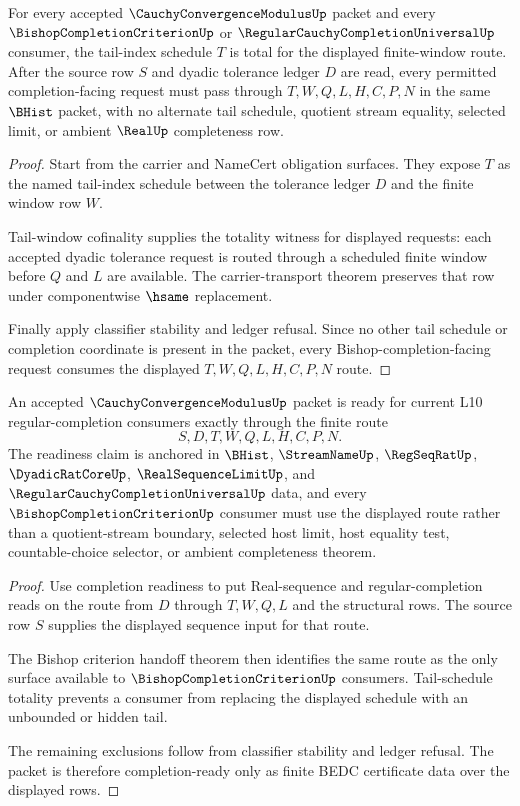\begin{theorem}
\label{thm:cauchy-convergence-modulus-tail-schedule-totality}
For every accepted $\CauchyConvergenceModulusUp$ packet and every $\BishopCompletionCriterionUp$ or $\RegularCauchyCompletionUniversalUp$ consumer, the tail-index schedule $T$ is total for the displayed finite-window route. After the source row $S$ and dyadic tolerance ledger $D$ are read, every permitted completion-facing request must pass through $T,W,Q,L,H,C,P,N$ in the same $\BHist$ packet, with no alternate tail schedule, quotient stream equality, selected limit, or ambient $\RealUp$ completeness row.
\end{theorem}
\begin{proof}
Start from the carrier and NameCert obligation surfaces. They expose $T$ as the named tail-index schedule between the tolerance ledger $D$ and the finite window row $W$.

Tail-window cofinality supplies the totality witness for displayed requests: each accepted dyadic tolerance request is routed through a scheduled finite window before $Q$ and $L$ are available. The carrier-transport theorem preserves that row under componentwise $\hsame$ replacement.

Finally apply classifier stability and ledger refusal. Since no other tail schedule or completion coordinate is present in the packet, every Bishop-completion-facing request consumes the displayed $T,W,Q,L,H,C,P,N$ route.
\end{proof}

\begin{theorem}
\label{thm:cauchy-convergence-modulus-regular-completion-readiness}
An accepted $\CauchyConvergenceModulusUp$ packet is ready for current L10 regular-completion consumers exactly through the finite route
$$
S,D,T,W,Q,L,H,C,P,N.
$$
The readiness claim is anchored in $\BHist$, $\StreamNameUp$, $\RegSeqRatUp$, $\DyadicRatCoreUp$, $\RealSequenceLimitUp$, and $\RegularCauchyCompletionUniversalUp$ data, and every $\BishopCompletionCriterionUp$ consumer must use the displayed route rather than a quotient-stream boundary, selected host limit, host equality test, countable-choice selector, or ambient completeness theorem.
\end{theorem}
\begin{proof}
Use completion readiness to put Real-sequence and regular-completion reads on the route from $D$ through $T,W,Q,L$ and the structural rows. The source row $S$ supplies the displayed sequence input for that route.

The Bishop criterion handoff theorem then identifies the same route as the only surface available to $\BishopCompletionCriterionUp$ consumers. Tail-schedule totality prevents a consumer from replacing the displayed schedule with an unbounded or hidden tail.

The remaining exclusions follow from classifier stability and ledger refusal. The packet is therefore completion-ready only as finite BEDC certificate data over the displayed rows.
\end{proof}


